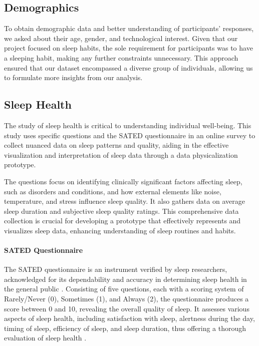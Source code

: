 \documentclass[
  a4paper,  %
  twoside,  %
  bibliography=totoc,
  headsepline,
  cleardoublepage=empty,
  parskip=half,
  draft=false
]{scrbook}
\begin{document}
\subsection{Demographics}
To obtain demographic data and better understanding of participants' responses, we asked about their age, gender, and technological interest. Given that our project focused on sleep habits, the sole requirement for participants was to have a sleeping habit, making any further constraints unnecessary. This approach ensured that our dataset encompassed a diverse group of individuals, allowing us to formulate more insights from our analysis.

\subsection{Sleep Health}
The study of sleep health is critical to understanding individual well-being. This study uses specific questions and the SATED questionnaire in an online survey to collect nuanced data on sleep patterns and quality, aiding in the effective visualization and interpretation of sleep data through a data physicalization prototype.

The questions focus on identifying clinically significant factors affecting sleep, such as disorders and conditions, and how external elements like noise, temperature, and stress influence sleep quality. It also gathers data on average sleep duration and subjective sleep quality ratings. This comprehensive data collection is crucial for developing a prototype that effectively represents and visualizes sleep data, enhancing understanding of sleep routines and habits.

\paragraph{SATED Questionnaire}
The SATED questionnaire is an instrument verified by sleep researchers, acknowledged for its dependability and accuracy in determining sleep health in the general public \cite{benitez_validation_2020}. Consisting of five questions, each with a scoring system of Rarely/Never (0), Sometimes (1), and Always (2), the questionnaire produces a score between 0 and 10, revealing the overall quality of sleep. It assesses various aspects of sleep health, including satisfaction with sleep, alertness during the day, timing of sleep, efficiency of sleep, and sleep duration, thus offering a thorough evaluation of sleep health \cite{Define_Sleep_Health}.
\end{document}

